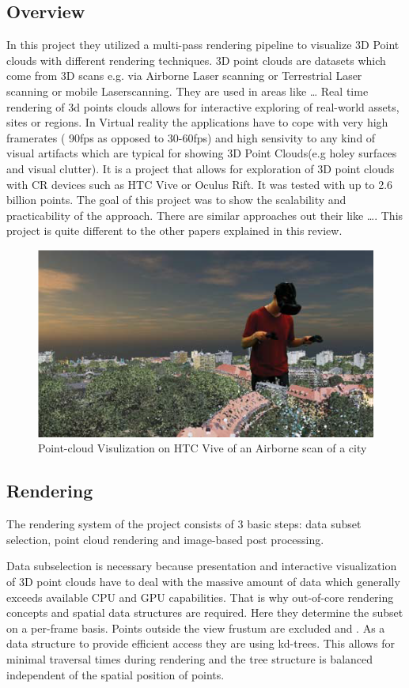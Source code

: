 \documentclass[10pt,twocolumn,letterpaper]{article}
\begin{document}
\subsection{Overview}
In this project \cite{discher_point-based_2018} they utilized a multi-pass rendering pipeline to visualize 3D Point clouds with different rendering techniques. 3D point clouds are datasets which come from 3D scans e.g. via Airborne Laser scanning or Terrestrial Laser scanning or mobile Laserscanning. They are used in areas like …
Real time rendering of 3d points clouds allows for interactive exploring of real-world assets, sites or regions. In Virtual reality the applications have to cope with very high framerates ( 90fps as opposed to 30-60fps) and high sensivity to any kind of visual artifacts which are typical for showing 3D Point Clouds(e.g holey surfaces and visual clutter). It is a project that allows for exploration of 3D point clouds with CR devices such as HTC Vive or Oculus Rift. It was tested with up to 2.6 billion points. The goal of this project was to show the scalability and practicability of the approach.
There are similar approaches out their like ….
This project is quite different to the other papers explained in this review.
\begin{figure}
	\includegraphics{pointcloud_1.png}
	\caption{Point-cloud Visulization on HTC Vive of an Airborne scan of a city}
	\label{img:pointcloud_1}
\end{figure}

\subsection{Rendering}
The rendering system of the project consists of 3 basic steps: data subset selection, point cloud rendering and image-based post processing.

\setlength{\parindent}{1pc}Data subselection is necessary because presentation and interactive visualization of 3D point clouds have to deal with the massive amount of data which generally exceeds available CPU and GPU capabilities. That is why out-of-core rendering concepts and spatial data structures are required. Here they determine the subset on a per-frame basis. Points outside the view frustum are excluded and . As a data structure to provide efficient access they are using kd-trees. This allows for minimal traversal times during rendering and the tree structure is balanced independent of the spatial position of points.
\end{document}
